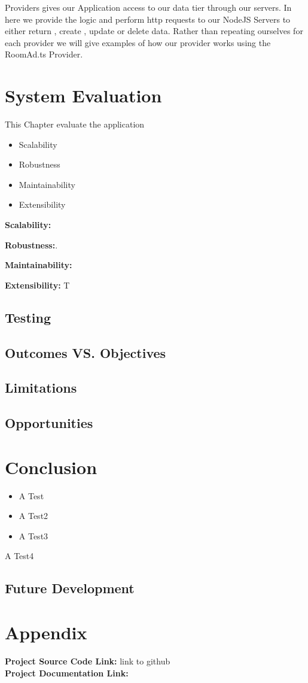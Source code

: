 Providers gives our Application access to our data tier through our servers. In here we provide the logic and perform http requests to our NodeJS Servers to either return , create , update or delete data. Rather than repeating ourselves for each provider we will give examples of how our provider works using the RoomAd.ts Provider.




\chapter{System Evaluation}
This Chapter evaluate the application
\begin{itemize}
    \item Scalability
    \item Robustness
    \item Maintainability
    \item Extensibility
\end{itemize}

\par \textbf{Scalability:} 

\par \textbf{Robustness:}.

\par \textbf{Maintainability:}

\par \textbf{Extensibility:} T

\section{Testing}

\section{Outcomes VS. Objectives}

\section{Limitations}

\section{Opportunities}

\chapter{Conclusion}


\begin{itemize}
\item A Test

\item A Test2
\item A Test3
\end{itemize}
A Test4
\section{Future Development}

\chapter{Appendix}

\textbf{Project Source Code Link: }link to github \\
\textbf{Project Documentation Link: } \\

